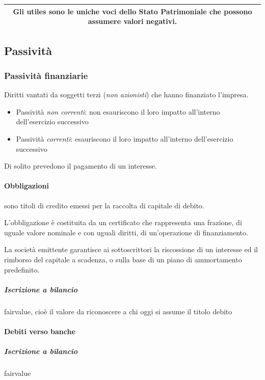 \documentclass[10pt,a4paper,fleqn,oneside]{book}
\begin{document}
\vspace{5mm}
\begin{center}
    \begin{tabular}{|c|}
        \hline
        Gli \glspl{utile} sono le uniche voci dello Stato Patrimoniale che 
    possono assumere valori negativi.\\
        \hline
    \end{tabular}
\end{center}

\subsection{Passività}

\subsubsection{Passività finanziarie}
Diritti vantati da soggetti terzi (\emph{non azionisti}) che hanno finanziato l’impresa.
\begin{itemize}
    \item Passività \emph{non correnti}: non esauriscono il loro impatto all’interno dell’\gls{esercizio} successivo
    \item Passività \emph{correnti}: esauriscono il loro impatto all’interno dell’\gls{esercizio} successivo 
\end{itemize}
Di solito prevedono il pagamento di un interesse.

\paragraph{Obbligazioni} sono titoli di credito emessi per la raccolta di capitale di debito.

L’obbligazione è costituita da un certificato che rappresenta una frazione, di uguale
valore nominale e con uguali diritti, di un’operazione di finanziamento.

La società emittente garantisce ai sottoscrittori la riscossione di un interesse
ed il rimborso del capitale a scadenza, o sulla base di un piano di ammortamento predefinito.

\subparagraph{Iscrizione a bilancio} \gls{fairvalue}, cioè il valore da riconoscere
a chi oggi si assume il titolo debito

\paragraph{Debiti verso banche}
\subparagraph{Iscrizione a bilancio} \gls{fairvalue}
\end{document}
